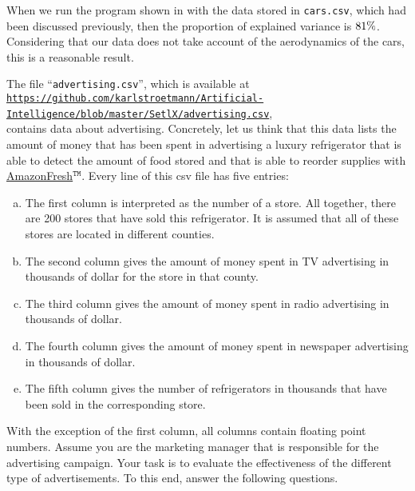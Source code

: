 When we run the program shown in  with the data stored in \texttt{cars.csv},
which had been discussed previously, then the proportion of explained variance is $81 \mathtt{\symbol{37}}$.  Considering that our data does
not take account of the aerodynamics of the cars, this is a reasonable result.


\exercise
The file ``\texttt{advertising.csv}'', which is available at
\\[0.2cm]
\hspace*{0.0cm}
\href{https://github.com/karlstroetmann/Artificial-Intelligence/blob/master/SetlX/advertising.csv}{\texttt{https://github.com/karlstroetmann/Artificial-Intelligence/blob/master/SetlX/advertising.csv}},
\\[0.2cm]
contains data about advertising.  Concretely, let us think that this data lists the amount of money that has
been spent in advertising a luxury refrigerator that is able to detect the amount of food stored and that is
able to reorder supplies with \href{https://en.wikipedia.org/wiki/AmazonFresh}{AmazonFresh}$^\mathtt{TM}$.
Every line of this csv file has five entries:
\begin{enumerate}[(a)]
\item The first column is interpreted as the number of a store.  All together, there are 200 stores that have sold this
      refrigerator.  It is assumed that all of these stores are located in different counties.
\item The second column gives the amount of money spent in TV advertising in thousands of dollar for the store in
      that county.
\item The third column gives the amount of money spent in radio advertising in thousands of dollar.
\item The fourth column gives the amount of money spent in newspaper advertising in thousands of dollar.
\item The fifth column gives the number of refrigerators in thousands that have been sold in the corresponding store.
\end{enumerate}
With the exception of the first column, all columns contain floating point numbers.
Assume you are the marketing manager that is responsible for the advertising campaign.  Your task is to
evaluate the effectiveness of the different type of advertisements.  To this end, answer the following questions.
